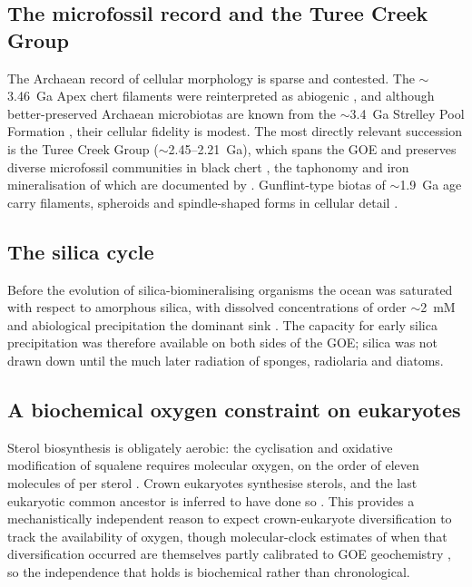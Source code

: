 \documentclass[11pt]{article}
\begin{document}
\subsection{The microfossil record and the Turee Creek Group}

The Archaean record of cellular morphology is sparse and contested. The $\sim$3.46~Ga Apex chert
filaments \citep{Schopf1993} were reinterpreted as abiogenic \citep{Brasier2002}, and although
better-preserved Archaean microbiotas are known from the $\sim$3.4~Ga Strelley Pool Formation
\citep{Sugitani2010,Delarue2020}, their cellular fidelity is modest. The most directly relevant
succession is the Turee Creek Group ($\sim$2.45--2.21~Ga), which spans the GOE and preserves diverse
microfossil communities in black chert \citep{Barlow2018}, the taphonomy and iron mineralisation of
which are documented by \citet{Lepot2017b}. Gunflint-type biotas of $\sim$1.9~Ga age carry
filaments, spheroids and spindle-shaped forms in cellular detail \citep{Lepot2017a,Javaux2018}.

\subsection{The silica cycle}

Before the evolution of silica-biomineralising organisms the ocean was saturated with respect to
amorphous silica, with dissolved concentrations of order $\sim$2~mM and abiological precipitation
the dominant sink \citep{Siever1992,Perry2007}. The capacity for early silica precipitation was
therefore available on both sides of the GOE; silica was not drawn down until the much later
radiation of sponges, radiolaria and diatoms.

\subsection{A biochemical oxygen constraint on eukaryotes}

Sterol biosynthesis is obligately aerobic: the cyclisation and oxidative modification of squalene
requires molecular oxygen, on the order of eleven molecules of  per sterol
\citep{Gold2017,Desmond2009}. Crown eukaryotes synthesise sterols, and the last eukaryotic common
ancestor is inferred to have done so \citep{Desmond2009}. This provides a mechanistically independent
reason to expect crown-eukaryote diversification to track the availability of oxygen, though
molecular-clock estimates of when that diversification occurred are themselves partly calibrated to
GOE geochemistry \citep{Gold2017}, so the independence that holds is biochemical rather than
chronological.
\end{document}
